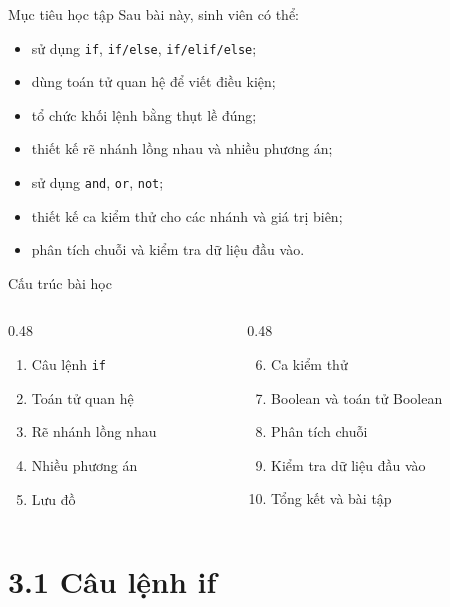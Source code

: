 \documentclass[aspectratio=169,11pt]{beamer}
\newcommand{\code}[1]{\texttt{#1}}
\begin{document}
\begin{frame}{Mục tiêu học tập}
Sau bài này, sinh viên có thể:
\begin{itemize}
  \item sử dụng \code{if}, \code{if/else}, \code{if/elif/else};
  \item dùng toán tử quan hệ để viết điều kiện;
  \item tổ chức khối lệnh bằng thụt lề đúng;
  \item thiết kế rẽ nhánh lồng nhau và nhiều phương án;
  \item sử dụng \code{and}, \code{or}, \code{not};
  \item thiết kế ca kiểm thử cho các nhánh và giá trị biên;
  \item phân tích chuỗi và kiểm tra dữ liệu đầu vào.
\end{itemize}
\end{frame}

\begin{frame}{Cấu trúc bài học}
\begin{columns}[T]
\begin{column}{0.48\textwidth}
\begin{enumerate}
  \item Câu lệnh \code{if}
  \item Toán tử quan hệ
  \item Rẽ nhánh lồng nhau
  \item Nhiều phương án
  \item Lưu đồ
\end{enumerate}
\end{column}
\begin{column}{0.48\textwidth}
\begin{enumerate}
\setcounter{enumi}{5}
  \item Ca kiểm thử
  \item Boolean và toán tử Boolean
  \item Phân tích chuỗi
  \item Kiểm tra dữ liệu đầu vào
  \item Tổng kết và bài tập
\end{enumerate}
\end{column}
\end{columns}
\end{frame}

\section{3.1 Câu lệnh if}
\end{document}
